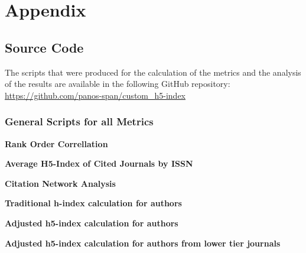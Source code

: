 \chapter{Appendix}
\label{ch:appendix}

\section{Source Code}

The scripts that were produced for the calculation of the metrics and the
analysis of the results are available in the following GitHub repository: \url{
    https://github.com/panos-span/custom_h5-index }

\subsection{General Scripts for all Metrics}

\textbf{Rank Order Correllation}



\textbf{Average H5-Index of Cited Journals by ISSN}




\textbf{Citation Network Analysis}





\textbf{Traditional h-index calculation for authors}





\textbf{Adjusted h5-index calculation for authors}





\textbf{Adjusted h5-index calculation for authors from lower tier journals}





